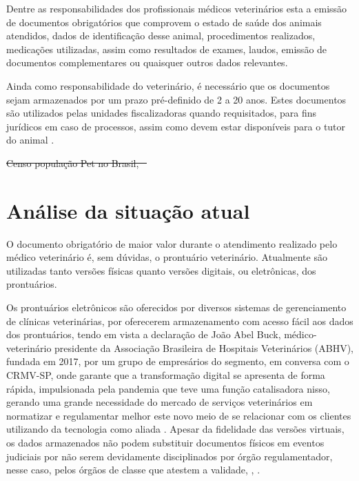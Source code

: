 \documentclass[
    12pt,               %
    openright,          %
    oneside,
    a4paper,            %
    BIBLATEX,           %
    TODO,               %
    english,            %
    brazil              %
    ]{ifsp-spo-inf-ctds}
\providecommand{\DIFdel}[1]{{\protect\color{red}\sout{#1}}}                      %
\providecommand{\DIFdelbegin}{} %
\providecommand{\DIFdelend}{} %
\providecommand{\DIFdelFL}[1]{\DIFdel{#1}} %
\newcommand{\DIFscaledelfig}{0.5}
\newlength{\DIFdelgraphicswidth} %
\newlength{\DIFdelgraphicsheight} %
\newcommand{\DIFdelincludegraphics}[2][]{%
\sbox{\DIFdelgraphicsbox}{\DIFOincludegraphics[#1]{#2}}%
\settoboxwidth{\DIFdelgraphicswidth}{\DIFdelgraphicsbox} %
\settoboxtotalheight{\DIFdelgraphicsheight}{\DIFdelgraphicsbox} %
\scalebox{\DIFscaledelfig}{%
\parbox[b]{\DIFdelgraphicswidth}{\usebox{\DIFdelgraphicsbox}\\[-\baselineskip] \rule{\DIFdelgraphicswidth}{0em}}\llap{\resizebox{\DIFdelgraphicswidth}{\DIFdelgraphicsheight}{%
\setlength{\unitlength}{\DIFdelgraphicswidth}%
\begin{picture}(1,1)%
\thicklines\linethickness{2pt} %
{\color[rgb]{1,0,0}\put(0,0){\framebox(1,1){}}}%
{\color[rgb]{1,0,0}\put(0,0){\line( 1,1){1}}}%
{\color[rgb]{1,0,0}\put(0,1){\line(1,-1){1}}}%
\end{picture}%
}\hspace*{3pt}}} %
} %
\DeclareRobustCommand{\DIFdelbegin}{\DIFOdelbegin \let\includegraphics\DIFdelincludegraphics} %
\DeclareRobustCommand{\DIFdelend}{\DIFOaddend \let\includegraphics\DIFOincludegraphics} %
\begin{document}
    Dentre as responsabilidades dos profissionais médicos veterinários esta a emissão de documentos obrigatórios que comprovem o estado de saúde dos animais atendidos, dados de identificação desse animal, procedimentos realizados, medicações utilizadas, assim como resultados de exames, laudos, emissão de documentos complementares ou quaisquer outros dados relevantes.

    Ainda como responsabilidade do veterinário, é necessário que os documentos sejam armazenados por um prazo pré-definido de 2 a 20 anos. Estes documentos são utilizados pelas unidades fiscalizadoras quando requisitados, para fins jurídicos em caso de processos, assim como devem estar disponíveis para o tutor do animal .

    \DIFdelbegin %
{%
\DIFdelFL{Censo população Pet no Brasil, \mbox{%
\citeonline{ibge2013, ibge2018, pet2021}}\hspace{0pt}%
}}

\DIFdelend \section{Análise da situação atual} \label{analise_atual}

    O documento obrigatório de maior valor durante o atendimento realizado pelo médico veterinário é, sem dúvidas, o prontuário veterinário. Atualmente são utilizadas tanto versões físicas quanto versões digitais, ou eletrônicas, dos prontuários.

    Os prontuários eletrônicos são oferecidos por diversos sistemas de gerenciamento de clínicas veterinárias, por oferecerem armazenamento com acesso fácil aos dados dos prontuários, tendo em vista a declaração de João Abel Buck, médico-veterinário presidente da Associação Brasileira de Hospitais Veterinários (ABHV), fundada em 2017, por um grupo de empresários do segmento, em conversa com o CRMV-SP, onde garante que a transformação digital se apresenta de forma rápida, impulsionada pela pandemia que teve uma função catalisadora nisso, gerando uma grande necessidade do mercado de serviços veterinários em normatizar e regulamentar melhor este novo meio de se relacionar com os clientes utilizando da tecnologia como aliada \cite{buck}. Apesar da fidelidade das versões virtuais, os dados armazenados não podem substituir documentos físicos em eventos judiciais por não serem devidamente disciplinados por órgão regulamentador, nesse caso, pelos órgãos de classe que atestem a validade, , .
\end{document}
